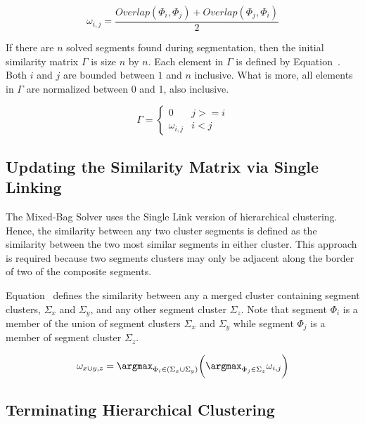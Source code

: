 \begin{equation} \label{eq:segmentSimilarity}
\omega_{i,j} = \frac{Overlap(\Phi_i, \Phi_j) + Overlap(\Phi_j, \Phi_i)}{2} 
\end{equation}

If there are $n$ solved segments found during segmentation, then the initial similarity matrix $\Gamma$ is size $n$ by $n$.  Each element in $\Gamma$ is defined by Equation~.  Both $i$ and $j$ are bounded between $1$ and $n$ inclusive.  What is more, all elements in $\Gamma$ are normalized between 0 and 1, also inclusive.

\begin{equation} \label{eq:similarityMatrix}
\Gamma = \begin{cases} 
	0 & j >= i
\\
	\omega_{i,j} & i < j
\end{cases} 
\end{equation}

\subsection{Updating the Similarity Matrix via Single Linking}

The Mixed-Bag Solver uses the Single Link version of hierarchical clustering.  Hence, the similarity between any two cluster segments is defined as the similarity between the two most similar segments in either cluster.  This approach is required because two segments clusters may only be adjacent along the border of two of the composite segments.  

Equation~ defines the similarity between any a merged cluster containing segment clusters, $\Sigma_x$ and $\Sigma_y$, and any other segment cluster $\Sigma_z$.  Note that segment $\Phi_i$ is a member of the union of segment clusters $\Sigma_x$ and $\Sigma_y$ while segment $\Phi_j$ is a member of segment cluster $\Sigma_z$.

\begin{equation} \label{eq:segmentClusterMerge}
	\omega_{x \cup y,z} = \argmax_{\Phi_i \in (\Sigma_x \cup \Sigma_y)} \bigg( \argmax_{\Phi_j \in \Sigma_z} \omega_{i,j} \bigg) 
\end{equation}

\subsection{Terminating Hierarchical Clustering}

